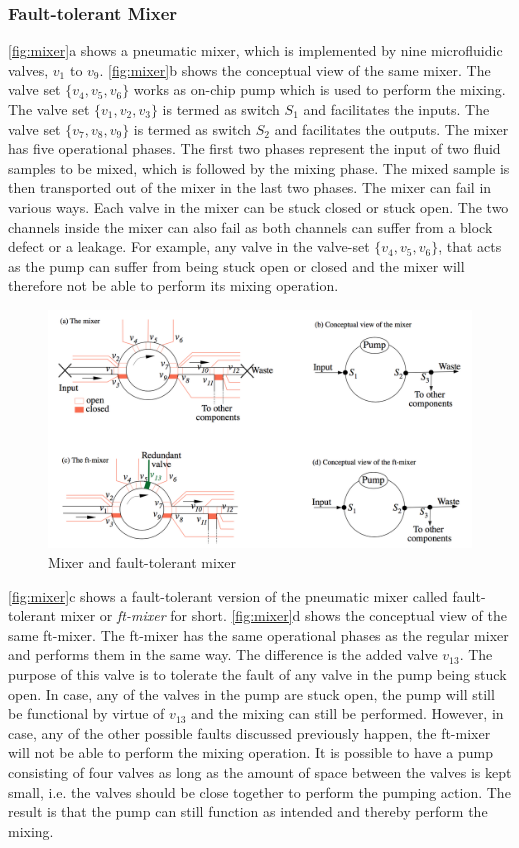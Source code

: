 \subsubsection{Fault-tolerant Mixer}
\autoref{fig:mixer}a shows a pneumatic mixer, which is implemented by nine microfluidic valves, $v_1$ to $v_9$. \autoref{fig:mixer}b shows the conceptual view of the same mixer. The valve set $\{v_4, v_5, v_6\}$ works as on-chip pump which is used to perform the mixing. The valve set $\{v_1, v_2, v_3\}$ is termed as switch $S_1$ and facilitates the inputs. The valve set $\{v_7, v_8, v_9\}$ is termed as switch $S_2$ and facilitates the outputs. The mixer has five operational phases. The first two phases represent the input of two fluid samples to be mixed, which is followed by the mixing phase. The mixed sample is then transported out of the mixer in the last two phases. The mixer can fail in various ways. Each valve in the mixer can be stuck closed or stuck open. The two channels inside the mixer can also fail as both channels can suffer from a block defect or a leakage. For example, any valve in the valve-set $\{v_4, v_5, v_6\}$, that acts as the pump can suffer from being stuck open or closed and the mixer will therefore not be able to perform its mixing operation. 
\begin{figure}
\centering
\includegraphics[scale=0.4]{figures/mixer-and-ftmixer.png}
\caption[Mixer and fault-tolerant mixer]{Mixer and fault-tolerant mixer}
\label{fig:mixer}
\end{figure}

\autoref{fig:mixer}c shows a fault-tolerant version of the pneumatic mixer called fault-tolerant mixer or \emph{ft-mixer} for short. \autoref{fig:mixer}d shows the conceptual view of the same ft-mixer. The ft-mixer has the same operational phases as the regular mixer and performs them in the same way. The difference is the added valve $v_{13}$. The purpose of this valve is to tolerate the fault of any valve in the pump being stuck open. In case, any of the valves in the pump are stuck open, the pump will still be functional by virtue of $v_{13}$ and the mixing can still be performed. However, in case, any of the other possible faults discussed previously happen, the ft-mixer will not be able to perform the mixing operation. It is possible to have a pump consisting of four valves as long as the amount of space between the valves is kept small, i.e. the valves should be close together to perform the pumping action. The result is that the pump can still function as intended and thereby perform the mixing.

